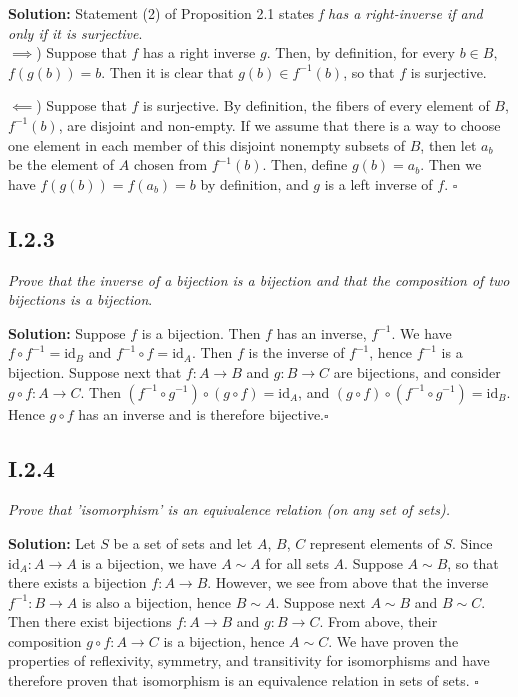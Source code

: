 \documentclass[11pt,a4paper]{article}
\begin{document}
\noindent \textbf{Solution:} Statement (2) of Proposition 2.1 states \textit{f has a right-inverse if and only if it is surjective}. \\

\noindent $\implies$) Suppose that $f$ has a right inverse $g$.  Then, by definition, for every $b \in B$, $f(g(b)) = b$.  Then it is clear that $g(b) \in f^{-1}(b)$, so that $f$ is surjective.

\noindent $\impliedby$) Suppose that $f$ is surjective.  By definition, the fibers of every element of $B$, $f^{-1}(b)$, are disjoint and non-empty.  If we assume that there is a way to choose one element in each member of this disjoint nonempty subsets of $B$, then let $a_b$ be the element of $A$ chosen from $f^{-1}(b)$.  Then, define $g(b) = a_b$.  Then we have $f(g(b)) = f(a_b) = b$ by definition, and $g$ is a left inverse of $f$. $\square$

\subsection*{I.2.3} \textit{Prove that the inverse of a bijection is a bijection and that the composition of two bijections is a bijection}.

\noindent \textbf{Solution:} Suppose $f$ is a bijection.  Then $f$ has an inverse, $f^{-1}$.  We have $f \circ f^{-1} = \text{id}_{B}$ and $f^{-1} \circ f = \text{id}_{A}$.  Then $f$ is the inverse of $f^{-1}$, hence $f^{-1}$ is a bijection.  Suppose next that $f: A \rightarrow B$ and $g: B \rightarrow C$ are bijections, and consider $g \circ f: A \rightarrow C$.  Then $(f^{-1} \circ g^{-1}) \circ (g \circ f) = \text{id}_{A}$, and $(g \circ f) \circ (f^{-1} \circ g^{-1}) = \text{id}_B$.  Hence $g \circ f$ has an inverse and is therefore bijective.$\square$

\subsection*{I.2.4} \textit{Prove that 'isomorphism' is an equivalence relation (on any set of sets).}

\noindent \textbf{Solution:} Let $S$ be a set of sets and let $A$, $B$, $C$ represent elements of $S$.  Since $\text{id}_A : A \rightarrow A$ is a bijection, we have $A \sim A$ for all sets $A$.  Suppose $A \sim B$, so that there exists a bijection $f: A \rightarrow B$.  However, we see from above that the inverse $f^{-1}: B \rightarrow A$ is also a bijection, hence $B \sim A$.  Suppose next $A \sim B$ and $B \sim C$.  Then there exist bijections $f: A \rightarrow B$ and $g: B \rightarrow C$.  From above, their composition $g \circ f: A \rightarrow C$ is a bijection, hence $A \sim C$.  We have proven the properties of reflexivity, symmetry, and transitivity for isomorphisms and have therefore proven that isomorphism is an equivalence relation in sets of sets. $\square$
\end{document}
